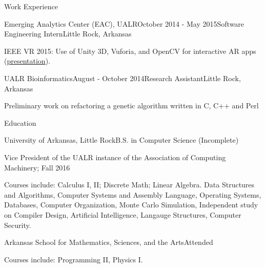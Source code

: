 \documentclass{resume} %
\begin{document}
\begin{rSection}{Work Experience}
\begin{rSubsection}{Emerging Analytics Center (EAC), UALR}{October 2014 - May 2015}{Software Engineering Intern}{Little Rock, Arkansas}
	\item IEEE VR 2015: Use of Unity 3D, Vuforia, and OpenCV for interactive AR apps (\href{http://byteflame.org/ieee_vr/}{presentation}{}).
\end{rSubsection}

\begin{rSubsection}{UALR Bioinformatics}{August - October 2014}{Research Assistant}{Little Rock, Arkansas}
	\item Preliminary work on refactoring a genetic algorithm written in C, C++ and Perl
\end{rSubsection}

\end{rSection}


\begin{rSection}{Education}

\begin{rSubsection}{University of Arkansas, Little Rock}{}{B.S. in Computer Science (Incomplete)}
	\item Vice President of the UALR instance of the Association of Computing Machinery; Fall 2016
	\item Courses include: Calculus I, II; Discrete Math; Linear Algebra. Data Structures and Algorithms, Computer Systems and Assembly Language, Operating Systems, Databases, Computer Organization, Monte Carlo Simulation, Independent study on Compiler Design, Artificial Intelligence, Langauge Structures, Computer Security.
\end{rSubsection}

\begin{rSubsection}{Arkansas School for Mathematics, Sciences, and the Arts}{}{Attended}
	\item Courses include: Programming II, Physics I.
\end{rSubsection}

\end{rSection}
\end{document}
